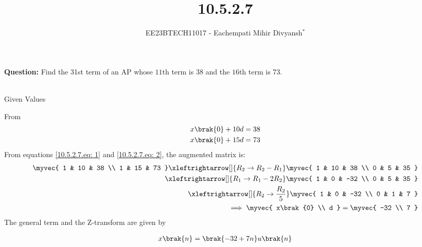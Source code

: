\documentclass[journal,12pt,twocolumn]{IEEEtran}
\theoremstyle{remark}
\begin{document}

\vspace{3cm}

\title{10.5.2.7}
\author{EE23BTECH11017 - Eachempati Mihir Divyansh$^{*}$%
}
\maketitle
\newpage
\bigskip

\renewcommand{\thefigure}{\theenumi}
\renewcommand{\thetable}{\theenumi}

\textbf{Question:} Find the 31st term of an AP whose $11$th term is 38 and the $16$th term is 73.
\\
\solution
 \fi
\\

\begin{table}[h!]
    \centering
    
    \caption{Given Values}
    \label{10.5.2.7.tab:1}
\end{table}
From  
\begin{align}
x\brak{0}+10d&=38\label{10.5.2.7.eq: 1}\\
x\brak{0}+15d&=73 \label{10.5.2.7.eq: 2}
\end{align}
From  equations \ref{10.5.2.7.eq: 1} and \ref{10.5.2.7.eq: 2}, the augmented matrix is:
\begin{align}
 \myvec{
   1 & 10 & 38
   \\
   1 & 15 & 73
 } 
 \xleftrightarrow[]{R_2 \rightarrow R_2-R_1} 
  \myvec{
   1 & 10 & 38
   \\
   0 & 5 & 35
 } \\
 \xleftrightarrow[]{R_1 \rightarrow R_1-2R_2} 
  \myvec{
   1 & 0 & -32
   \\
   0 & 5 & 35
 } \\
  \xleftrightarrow[]{R_2 \rightarrow \frac{R_2}{5}} 
  \myvec{
   1 & 0 & -32
   \\
   0 & 1 & 7
 } \\
 \implies \myvec{
   x\brak{0}
   \\
   d
 }
 =
 \myvec{
   -32
   \\
   7
 }
 \end{align}
 The general term and the Z-transform are given by

 \begin{align}
    x\brak{n}&=\brak{-32+7n}u\brak{n}\\ 
 \end{align}
\end{document}
